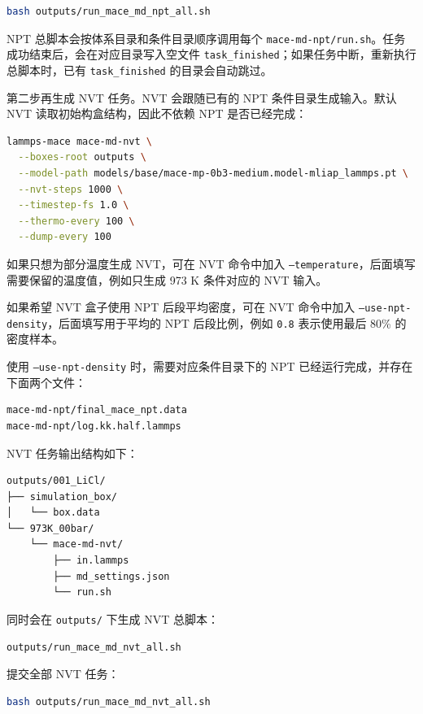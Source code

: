 \documentclass[11pt,a4paper]{article}
\begin{document}
\begin{lstlisting}[language=bash]
bash outputs/run_mace_md_npt_all.sh
\end{lstlisting}

NPT 总脚本会按体系目录和条件目录顺序调用每个 \texttt{mace-md-npt/run.sh}。任务成功结束后，会在对应目录写入空文件 \texttt{task\_finished}；如果任务中断，重新执行总脚本时，已有
\texttt{task\_finished} 的目录会自动跳过。

第二步再生成 NVT 任务。NVT 会跟随已有的 NPT 条件目录生成输入。默认 NVT 读取初始构盒结构，因此不依赖 NPT 是否已经完成：

\begin{lstlisting}[language=bash]
lammps-mace mace-md-nvt \
  --boxes-root outputs \
  --model-path models/base/mace-mp-0b3-medium.model-mliap_lammps.pt \
  --nvt-steps 1000 \
  --timestep-fs 1.0 \
  --thermo-every 100 \
  --dump-every 100
\end{lstlisting}

如果只想为部分温度生成 NVT，可在 NVT 命令中加入 \texttt{--temperature}，后面填写需要保留的温度值，例如只生成 973 K 条件对应的 NVT 输入。

如果希望 NVT 盒子使用 NPT 后段平均密度，可在 NVT 命令中加入 \texttt{--use-npt-density}，后面填写用于平均的 NPT 后段比例，例如 \texttt{0.8} 表示使用最后 80\% 的密度样本。

使用 \texttt{--use-npt-density} 时，需要对应条件目录下的 NPT 已经运行完成，并存在下面两个文件：

\begin{lstlisting}
mace-md-npt/final_mace_npt.data
mace-md-npt/log.kk.half.lammps
\end{lstlisting}

NVT 任务输出结构如下：

\begin{lstlisting}
outputs/001_LiCl/
├── simulation_box/
│   └── box.data
└── 973K_00bar/
    └── mace-md-nvt/
        ├── in.lammps
        ├── md_settings.json
        └── run.sh
\end{lstlisting}

同时会在 \texttt{outputs/} 下生成 NVT 总脚本：

\begin{lstlisting}
outputs/run_mace_md_nvt_all.sh
\end{lstlisting}

提交全部 NVT 任务：

\begin{lstlisting}[language=bash]
bash outputs/run_mace_md_nvt_all.sh
\end{lstlisting}
\end{document}
